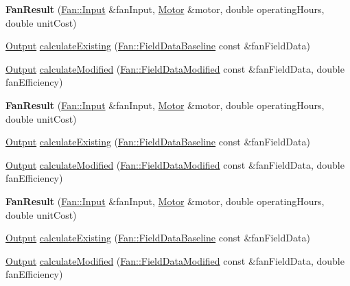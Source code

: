 \begin{DoxyCompactItemize}
\item 
\mbox{\label{class_fan_result_a337f5f21d1d73ed5ede7d5083e2490ce}} 
{\bfseries Fan\+Result} (\hyperlink{struct_fan_1_1_input}{Fan\+::\+Input} \&fan\+Input, \hyperlink{struct_motor}{Motor} \&motor, double operating\+Hours, double unit\+Cost)
\item 
\hyperlink{struct_fan_result_1_1_output}{Output} \hyperlink{class_fan_result_ad9bd0cc8f62fcb7bb7aca7eea511a2f3}{calculate\+Existing} (\hyperlink{struct_fan_1_1_field_data_baseline}{Fan\+::\+Field\+Data\+Baseline} const \&fan\+Field\+Data)
\item 
\hyperlink{struct_fan_result_1_1_output}{Output} \hyperlink{class_fan_result_ac8b8ab301fca8ce4d37e6d4fbd44b9b9}{calculate\+Modified} (\hyperlink{struct_fan_1_1_field_data_modified}{Fan\+::\+Field\+Data\+Modified} const \&fan\+Field\+Data, double fan\+Efficiency)
\item 
\mbox{\label{class_fan_result_a337f5f21d1d73ed5ede7d5083e2490ce}} 
{\bfseries Fan\+Result} (\hyperlink{struct_fan_1_1_input}{Fan\+::\+Input} \&fan\+Input, \hyperlink{struct_motor}{Motor} \&motor, double operating\+Hours, double unit\+Cost)
\item 
\hyperlink{struct_fan_result_1_1_output}{Output} \hyperlink{class_fan_result_abc80cb0fb339969c2497786e479d9484}{calculate\+Existing} (\hyperlink{struct_fan_1_1_field_data_baseline}{Fan\+::\+Field\+Data\+Baseline} const \&fan\+Field\+Data)
\item 
\hyperlink{struct_fan_result_1_1_output}{Output} \hyperlink{class_fan_result_a64173c80c723487b8a555250d22be459}{calculate\+Modified} (\hyperlink{struct_fan_1_1_field_data_modified}{Fan\+::\+Field\+Data\+Modified} const \&fan\+Field\+Data, double fan\+Efficiency)
\item 
\mbox{\label{class_fan_result_a337f5f21d1d73ed5ede7d5083e2490ce}} 
{\bfseries Fan\+Result} (\hyperlink{struct_fan_1_1_input}{Fan\+::\+Input} \&fan\+Input, \hyperlink{struct_motor}{Motor} \&motor, double operating\+Hours, double unit\+Cost)
\item 
\hyperlink{struct_fan_result_1_1_output}{Output} \hyperlink{class_fan_result_abc80cb0fb339969c2497786e479d9484}{calculate\+Existing} (\hyperlink{struct_fan_1_1_field_data_baseline}{Fan\+::\+Field\+Data\+Baseline} const \&fan\+Field\+Data)
\item 
\hyperlink{struct_fan_result_1_1_output}{Output} \hyperlink{class_fan_result_a64173c80c723487b8a555250d22be459}{calculate\+Modified} (\hyperlink{struct_fan_1_1_field_data_modified}{Fan\+::\+Field\+Data\+Modified} const \&fan\+Field\+Data, double fan\+Efficiency)
\end{DoxyCompactItemize}



